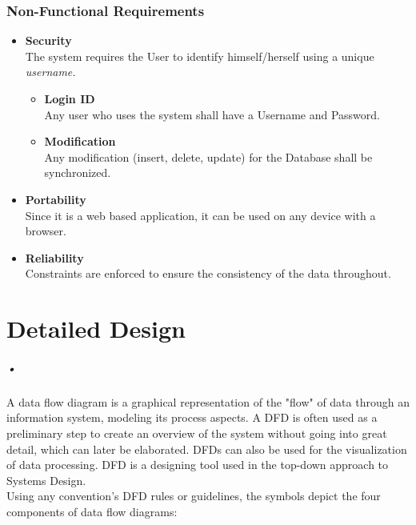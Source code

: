 \documentclass[12pt]{report}
\begin{document}
\subsection{Non-Functional Requirements}
\begin{itemize}

\item\textbf{Security } \\The system requires the User to identify himself/herself using a unique \emph{username.} 
\begin{itemize}
\item\textbf{Login ID } \\Any user who uses the system shall have a Username and Password. 

\item\textbf{Modification} \\Any modification (insert, delete, update) for the Database shall be synchronized. 


\end{itemize}

\item\textbf{Portability } \\Since it is a web based application, it can be used on any device with a browser.

\item\textbf{Reliability} \\Constraints are enforced to ensure the consistency of the data throughout. 

\end{itemize}


\chapter{Detailed Design}
\paragraph*{•}
A data flow diagram is a graphical representation of the "flow" of data through an information system, modeling its process aspects. A DFD is often used as a preliminary step to create an overview of the system without going into great detail, which can later be elaborated. DFDs can also be used for the visualization of data processing. DFD is a designing tool used in the top-down approach to Systems Design. \\

Using any convention’s DFD rules or guidelines, the symbols depict the four components of data flow diagrams:
\end{document}
